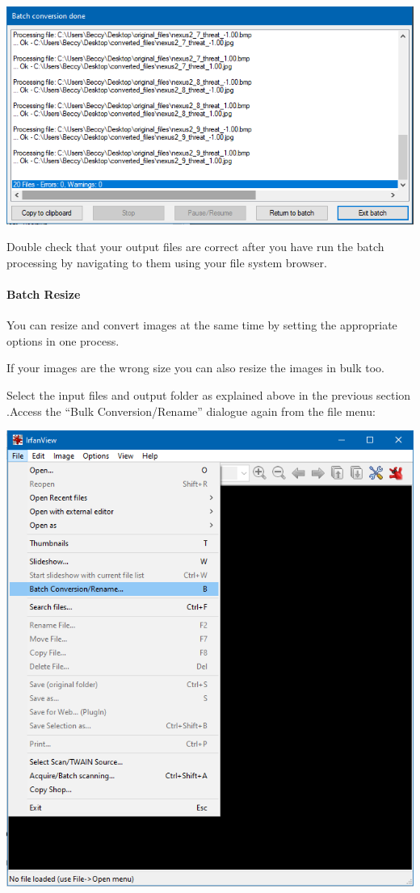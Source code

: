 \documentclass[]{book}
\let\oldparagraph\paragraph
\renewcommand{\paragraph}[1]{\oldparagraph{#1}\mbox{}}
\begin{document}
\includegraphics{images/screenshots/irfanview_7a.png}

Double check that your output files are correct after you have run the
batch processing by navigating to them using your file system browser.

\paragraph{Batch Resize}\label{batch-resize}

\begin{info}
You can resize and convert images at the same time by setting the
appropriate options in one process.
\end{info}

If your images are the wrong size you can also resize the images in bulk
too.

Select the input files and output folder as explained above in the
previous section .Access the ``Bulk Conversion/Rename'' dialogue again
from the file menu:

\includegraphics{images/screenshots/irfanview_2.png}
\end{document}

